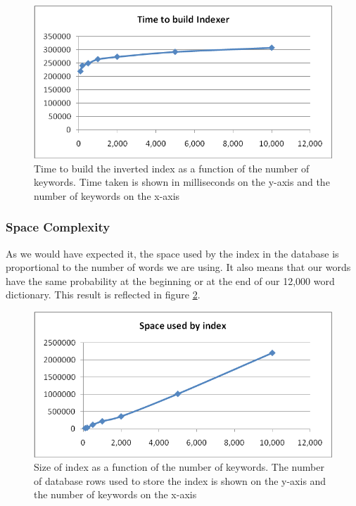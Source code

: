 \documentclass[10pt]{report}
\begin{document}
\begin{itemize}
  \begin{figure}[h]
    \begin{center}
      \includegraphics[width=\textwidth,height=!]{numkeywordstimecomplexbuildindex}
    \end{center}
    \caption{Time to build the inverted index as a function of the
      number of keywords. Time taken is shown in milliseconds on the
      y-axis and the number of keywords on the x-axis}
    \label{fig:numkeywordstimecomplexbuildindex}
  \end{figure} 

\end{itemize}


\subsubsection{Space Complexity}
As we would have expected it, the space used by the index in the
database is proportional to the number of words we are using. It also
means that our words have the same probability at the beginning or at
the end of our 12,000 word dictionary. This result is reflected in
figure \ref{fig:numkeywordsspacecomplexbuildindex}.

\begin{figure}
  \begin{center}
    \includegraphics[width=\textwidth,height=!]{numkeywordsspacecomplexbuildindex}
  \end{center}
    \caption{Size of index as a function of the number of
      keywords. The number of database rows used to store the index is
      shown on the y-axis and the number of keywords on the x-axis} 
    \label{fig:numkeywordsspacecomplexbuildindex}
\end{figure} 
\end{document}
